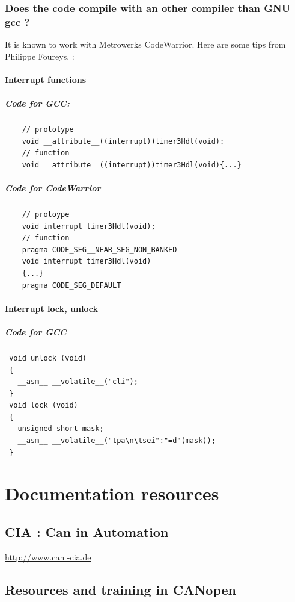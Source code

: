 \documentclass[12pt,english,a4paper]{book}
\newcommand{\canopen}{CANopen }
\begin{document}
\subsubsection{Does the code compile with an other compiler than GNU gcc ?}

It is known to work with Metrowerks CodeWarrior. Here are some tips
from Philippe Foureys. :


\paragraph{Interrupt functions}


\subparagraph{Code for GCC:
}


\begin{verbatim}
	// prototype
	void __attribute__((interrupt))timer3Hdl(void):
	// function
	void __attribute__((interrupt))timer3Hdl(void){...}
\end{verbatim}

	
\subparagraph{Code for CodeWarrior
}


\begin{verbatim}
	// protoype
	void interrupt timer3Hdl(void);
	// function
	pragma CODE_SEG__NEAR_SEG_NON_BANKED
	void interrupt timer3Hdl(void)
	{...}
	pragma CODE_SEG_DEFAULT\end{verbatim}


\paragraph{Interrupt lock, unlock
}


\subparagraph{Code for GCC
}


\begin{verbatim}
 void unlock (void)
 {
   __asm__ __volatile__("cli");
 }
 void lock (void)
 {
   unsigned short mask;
   __asm__ __volatile__("tpa\n\tsei":"=d"(mask));
 }
\end{verbatim}

\section{Documentation resources}


\subsection{CIA : Can in Automation }

\href{http://www.can-cia.de/}{http://www.can -cia.de}


\subsection{Resources and training in \canopen 
}
\end{document}

